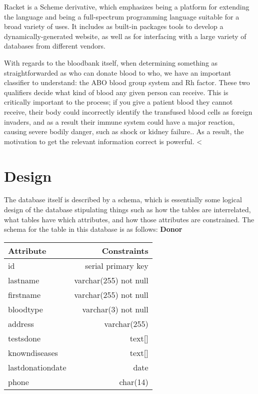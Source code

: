 \documentclass[runningheads,a4paper]{llncs}
\begin{document}
Racket is a Scheme derivative, which emphasizes being a platform for
extending the language and being a full-spectrum programming language
suitable for a broad variety of uses.\cite{racket-org} It includes as
built-in packages tools to develop a dynamically-generated website, as
well as for interfacing with a large variety of databases from
different vendors.

With regards to the bloodbank itself, when determining something as straightforwarded as who can donate blood to who, we have an important classifier to understand: the ABO blood group system and Rh factor. These two qualifiers decide what kind of blood any given person can receive.\cite{redcross-types} This is critically important to the process; if you give a patient blood they cannot receive, their body could incorrectly identify the transfused blood cells as foreign invaders, and as a result their immune system could have a major reaction, causing severe bodily danger, such as shock or kidney failure.\cite{nih-blood}. As a result, the motivation to get the relevant information correct is powerful.
<

\section{Design}\label{sec:design}
The database itself is described by a schema, which is essentially
some logical design of the database stipulating things such as how the
tables are interrelated, what tables have which attributes, and how
those attributes are constrained. The schema for the table in this
database is as follows:
\newline
\textbf{Donor}
\newline
\begin{tabular}{| l | r |}
  \hline
  Attribute & Constraints \\
  \hline
  id & serial primary key \\
  lastname & varchar(255) not null \\
  firstname & varchar(255) not null \\
  bloodtype & varchar(3) not null \\
  address & varchar(255) \\
  testsdone & text[] \\
  knowndiseases & text[] \\
  lastdonationdate & date \\
  phone & char(14) \\
  \hline
\end{tabular}
\end{document}
